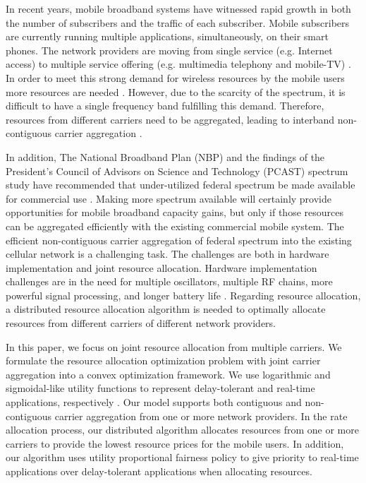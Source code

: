 \documentclass[conference]{IEEEtran}
\begin{document}
In recent years, mobile broadband systems have witnessed rapid growth in both the number of subscribers and the traffic of each subscriber. Mobile subscribers are currently running multiple applications, simultaneously, on their smart phones. The network providers are moving from single service (e.g. Internet access) to multiple service offering (e.g. multimedia telephony and mobile-TV) \cite{QoS_3GPP}. In order to meet this strong demand for wireless resources by the mobile users more resources are needed \cite{Carrier_Agg_1}. However, due to the scarcity of the spectrum, it is difficult to have a single frequency band fulfilling this demand. Therefore, resources from different carriers need to be aggregated, leading to interband non-contiguous carrier aggregation \cite{Carrier_Agg_2}.

In addition, The National Broadband Plan (NBP) and the findings of the President's Council of Advisors on Science and Technology (PCAST) spectrum study have recommended that under-utilized federal spectrum be made available for commercial use \cite{PCAST}. Making more spectrum available will certainly provide opportunities for mobile broadband capacity gains, but only if those resources can be aggregated efficiently with the existing commercial mobile system. The efficient  non-contiguous carrier aggregation of federal spectrum into the existing cellular network is a challenging task. The challenges are both in hardware implementation and joint resource allocation. Hardware implementation challenges are in the need for multiple oscillators, multiple RF chains, more powerful signal processing, and longer battery life \cite{RebeccaThesis}. Regarding resource allocation, a distributed resource allocation algorithm is needed to optimally allocate resources from different carriers of different network providers.

In this paper, we focus on joint resource allocation from multiple carriers. We formulate the resource allocation optimization problem with joint carrier aggregation into a convex optimization framework. We use logarithmic and sigmoidal-like utility functions to represent delay-tolerant and real-time applications, respectively \cite{Ahmed_Utility1}. Our model supports both contiguous and non-contiguous carrier aggregation from one or more network providers. In the rate allocation process, our distributed algorithm allocates resources from one or more carriers to provide the lowest resource prices for the mobile users. In addition, our algorithm uses utility proportional fairness policy to give priority to real-time applications over delay-tolerant applications when allocating resources.
\end{document}
